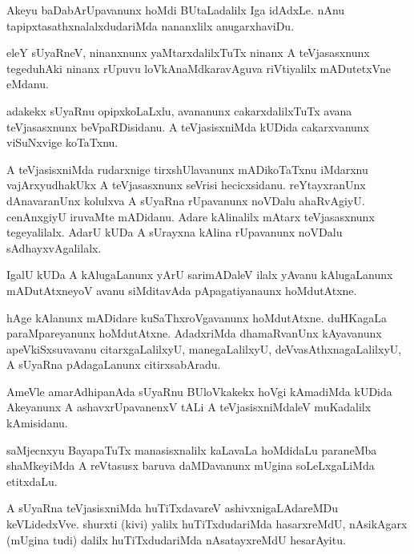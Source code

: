 \documentclass{article}
\begin{document}
\begin{mn}
Akeyu baDabArUpavanunx hoMdi BUtaLadalilx Iga idAdxLe. nAnu
tapipxtasathxnalalxdudariMda nananxlilx anugarxhaviDu.
\end{mn}

\begin{mn}
eleY sUyaRneV, ninanxnunx yaMtarxdalilxTuTx ninanx A teVjasasxnunx
tegeduhAki ninanx rUpuvu loVkAnaMdkaravAguva riVtiyalilx mADutetxVne eMdanu.
\end{mn}

\begin{mn}
adakekx sUyaRnu opipxkoLaLxlu, avananunx cakarxdalilxTuTx avana
teVjasasxnunx beVpaRDisidanu. A teVjasisxniMda kUDida cakarxvanunx
viSuNxvige koTaTxnu.
\end{mn}

\begin{mn}%
A teVjasisxniMda rudarxnige tirxshUlavanunx mADikoTaTxnu iMdarxnu
vajArxyudhakUkx A teVjasasxnunx seVrisi hecicxsidanu. reYtayxranUnx
dAnavaranUnx kolulxva A sUyaRna rUpavanunx noVDalu
ahaRvAgiyU. cenAnxgiyU iruvaMte mADidanu. Adare kAlinalilx mAtarx
teVjasasxnunx tegeyalilalx. AdarU kUDa A sUrayxna kAlina rUpavanunx
noVDalu sAdhayxvAgalilalx.
\end{mn}

\begin{mn}
IgalU kUDa A kAlugaLanunx yArU sarimADaleV ilalx yAvanu kAlugaLanunx
mADutAtxneyoV avanu siMditavAda pApagatiyanaunx hoMdutAtxne.
\end{mn}

\begin{mn}%
hAge kAlanunx mADidare kuSaThxroVgavanunx hoMdutAtxne. duHKagaLa
paraMpareyanunx hoMdutAtxne. AdadxriMda dhamaRvanUnx kAyavanunx
apeVkiSxsuvavanu citarxgaLalilxyU, manegaLalilxyU,
deVvasAthxnagaLalilxyU, A sUyaRna pAdagaLanunx citirxsabAradu.
\end{mn}

\begin{mn}%
AmeVle amarAdhipanAda sUyaRnu BUloVkakekx hoVgi kAmadiMda kUDida
Akeyanunx A ashavxrUpavanenxV tALi A teVjasisxniMdaleV muKadalilx kAmisidanu.
\end{mn}

\begin{mn}
saMjecnxyu BayapaTuTx manasisxnalilx kaLavaLa hoMdidaLu paraneMba
shaMkeyiMda A reVtasusx baruva daMDavanunx mUgina soLeLxgaLiMda etitxdaLu.
\end{mn}

\begin{mn}%
A sUyaRna teVjasisxniMda huTiTxdavareV ashivxnigaLAdareMDu
keVLidedxVve. shurxti (kivi) yalilx huTiTxdudariMda hasarxreMdU,
nAsikAgarx (mUgina tudi) dalilx huTiTxdudariMda nAsatayxreMdU hesarAyitu.
\end{mn}
\end{document}
